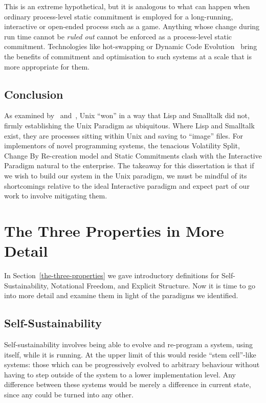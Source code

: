 \documentclass[ twoside,openright,titlepage,numbers=noenddot,headinclude,footinclude,cleardoublepage=empty,abstract=on,
                BCOR=5mm,paper=a4,fontsize=11pt
                ]{scrreprt}
\theoremstyle{definition}
\begin{document}
This is an extreme hypothetical, but it is analogous to what can happen
when ordinary process-level static commitment is employed for a
long-running, interactive or open-ended process such as a game. Anything
whose change during run time cannot be \emph{ruled out} cannot be
enforced as a process-level static commitment. Technologies like
hot-swapping or Dynamic Code Evolution~\parencite{DynCodeEvol} bring the
benefits of commitment and optimisation to such systems at a scale that
is more appropriate for them.

\hypertarget{conclusion}{\subsection{Conclusion}\label{conclusion}}

As examined by~\textcite{WIB} and~\textcite{Kell-OS}, Unix ``won'' in a
way that Lisp and Smalltalk did not, firmly establishing the Unix
Paradigm as ubiquitous. Where Lisp and Smalltalk exist, they are
processes sitting within Unix and saving to ``image'' files. For
implementors of novel programming systems, the tenacious Volatility
Split, Change By Re-creation model and Static Commitments clash with the
Interactive Paradigm natural to the enterprise. The takeaway for this
dissertation is that if we wish to build our system in the Unix
paradigm, we must be mindful of its shortcomings relative to the ideal
Interactive paradigm and expect part of our work to involve mitigating
them.

\hypertarget{the-three-properties-in-more-detail}{\section{The Three Properties in More
Detail}\label{the-three-properties-in-more-detail}}

In Section~\ref{the-three-properties} we gave introductory definitions
for Self-Sustainability, Notational Freedom, and Explicit Structure. Now
it is time to go into more detail and examine them in light of the
paradigms we identified.

\hypertarget{self-sustainability}{\subsection{Self-Sustainability}\label{self-sustainability}}

Self-sustainability involves being able to evolve and re-program a
system, using itself, while it is running. At the upper limit of this
would reside ``stem cell''-like systems: those which can be
progressively evolved to arbitrary behaviour without having to step
outside of the system to a lower implementation level. Any difference
between these systems would be merely a difference in current state,
since any could be turned into any other.
\end{document}
